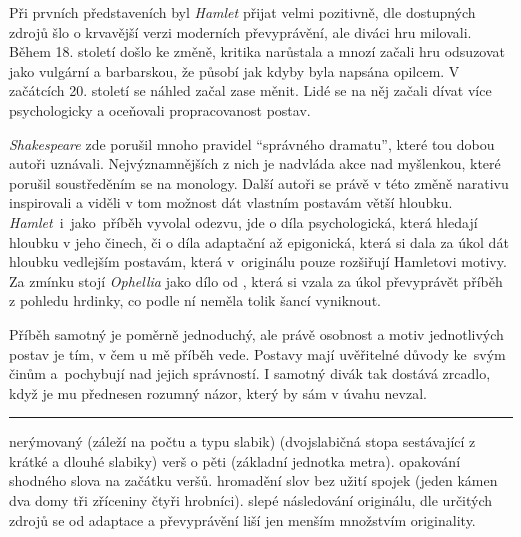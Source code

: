 \documentclass[../main.tex]{subfiles}
\begin{document}

\noindent
Při prvních představeních byl \textit{Hamlet} přijat velmi pozitivně, dle dostupných zdrojů šlo o krvavější verzi moderních převyprávění, ale diváci hru milovali.
Během 18. století došlo ke změně, kritika narůstala a mnozí začali hru odsuzovat jako vulgární a barbarskou, že působí jak kdyby byla napsána opilcem.
V začátcích 20. století se náhled začal zase měnit.
Lidé se na něj začali dívat více psychologicky a oceňovali propracovanost postav.

\noindent
\textit{Shakespeare} zde porušil mnoho pravidel \enquote{správného dramatu},
které tou dobou autoři uznávali.
Nejvýznamnějších z nich je nadvláda akce nad myšlenkou, které porušil soustředěním se na monology.
Další autoři se právě v této změně narativu inspirovali
a viděli v tom možnost dát vlastním postavám větší hloubku.
\textit{Hamlet}~i~jako~příběh vyvolal odezvu, jde o díla psychologická,
která hledají hloubku v jeho činech, či o díla adaptační až epigonická,
která si dala za úkol dát hloubku vedlejším postavám, která v~originálu pouze rozšiřují Hamletovi motivy. \\
Za zmínku stojí \textit{Ophellia} jako dílo od ,
která si vzala za úkol převyprávět příběh z pohledu hrdinky, co podle ní neměla tolik šancí vyniknout.


\noindent 
Příběh samotný je poměrně jednoduchý, ale právě osobnost a motiv jednotlivých postav je tím,
v čem u mě příběh vede.
Postavy mají uvěřitelné důvody ke~svým činům a~pochybují nad jejich správností.
I samotný divák tak dostává zrcadlo, když je mu přednesen rozumný názor, který by sám v úvahu nevzal.
    
\vfill

\noindent\begin{minipage}{\textwidth}
    {\textcolor{MPC}{\rule{\linewidth}{0.4pt}}
    \footnotesize
     nerýmovaný 
    (záleží na počtu a typu slabik) 
    (dvojslabičná stopa sestávající z krátké a dlouhé slabiky) verš o pěti
     (základní jednotka metra).
     opakování shodného slova na začátku veršů.
     hromadění slov bez užití spojek
    (jeden kámen dva domy tři zříceniny čtyři hrobníci).
     slepé následování originálu, dle určitých zdrojů se od adaptace
    a převyprávění liší jen menším množstvím originality.
    }
\end{minipage}

\ispageodd
\newpage
\end{document}
